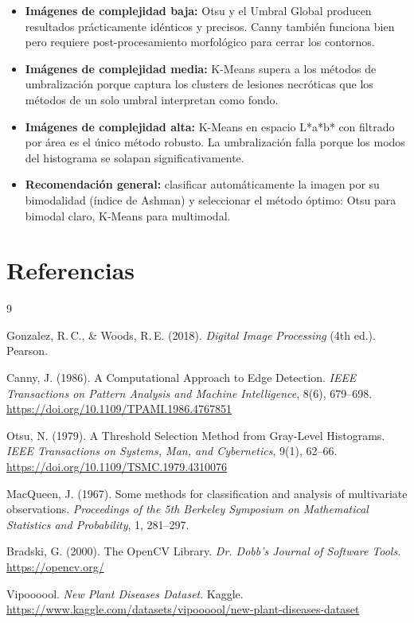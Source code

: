 \documentclass[11pt,a4paper]{article}
\begin{document}
\begin{itemize}
    \item \textbf{Imágenes de complejidad baja:} Otsu y el Umbral Global
    producen resultados prácticamente idénticos y precisos. Canny también
    funciona bien pero requiere post-procesamiento morfológico para cerrar
    los contornos.

    \item \textbf{Imágenes de complejidad media:} K-Means supera a los
    métodos de umbralización porque captura los clusters de lesiones necróticas
    que los métodos de un solo umbral interpretan como fondo.

    \item \textbf{Imágenes de complejidad alta:} K-Means en espacio L*a*b*
    con filtrado por área es el único método robusto. La umbralización falla
    porque los modos del histograma se solapan significativamente.

    \item \textbf{Recomendación general:} clasificar automáticamente la imagen
    por su bimodalidad (índice de Ashman) y seleccionar el método óptimo:
    Otsu para bimodal claro, K-Means para multimodal.
\end{itemize}

\section{Referencias}

\begin{thebibliography}{9}

Gonzalez, R.\,C., \& Woods, R.\,E. (2018).
\textit{Digital Image Processing} (4th ed.). Pearson.

Canny, J. (1986).
A Computational Approach to Edge Detection.
\textit{IEEE Transactions on Pattern Analysis and Machine Intelligence},
8(6), 679--698. \url{https://doi.org/10.1109/TPAMI.1986.4767851}

Otsu, N. (1979).
A Threshold Selection Method from Gray-Level Histograms.
\textit{IEEE Transactions on Systems, Man, and Cybernetics},
9(1), 62--66. \url{https://doi.org/10.1109/TSMC.1979.4310076}

MacQueen, J. (1967).
Some methods for classification and analysis of multivariate observations.
\textit{Proceedings of the 5th Berkeley Symposium on Mathematical Statistics
and Probability}, 1, 281--297.

Bradski, G. (2000).
The OpenCV Library.
\textit{Dr. Dobb's Journal of Software Tools}.
\url{https://opencv.org/}

Vipoooool. \textit{New Plant Diseases Dataset}. Kaggle.
\url{https://www.kaggle.com/datasets/vipoooool/new-plant-diseases-dataset}

\end{thebibliography}
\end{document}
